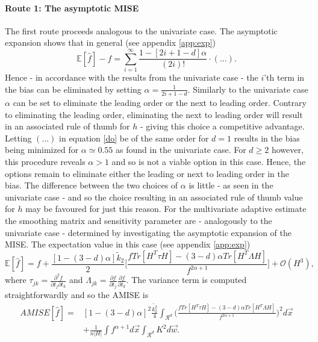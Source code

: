 \documentclass[
twoside,
openright,
titlepage,
numbers=noenddot,
headinclude,%
footinclude=true,
dottedtoc, %
ngerman,
american, %
pagesize=pdftex,
]{book}
\begin{document}
	\paragraph{Route 1: The asymptotic MISE}
	The first route proceeds analogous to the univariate case. The asymptotic expansion shows that in general (see appendix \ref{app:exp})
	\begin{equation}
		\mathbb{E}[\hat{f}]-f=\sum_{i=1}^{\infty}\frac{1-[2i+1-d]\alpha}{(2i)!}\cdot (\dots).
		\label{do}
	\end{equation}
	Hence - in accordance with the results from the univariate case - the $i$'th term in the bias can be eliminated by setting $\alpha=\frac{1}{2i+1-d}$. Similarly to the univariate case $\alpha$ can be set to eliminate the leading order or the next to leading order. Contrary to eliminating the leading order, eliminating the next to leading order will result in an associated rule of thumb for $h$ - giving this choice a competitive advantage. Letting $(\dots)$ in equation \eqref{do} be of the same order for $d=1$ results in the bias being minimized for $\alpha\simeq 0.55$ as found in the univariate case. For $d\geq 2$ however, this procedure reveals $\alpha>1$ and so is not a viable option in this case. Hence, the options remain to eliminate either the leading or next to leading order in the bias. The difference between the two choices of $\alpha$ is little - as seen in the univariate case - and so the choice resulting in an associated rule of thumb value for $h$ may be favoured for just this reason.\newline\newline
	\noindent For the multivariate adaptive estimate the smoothing matrix and sensitivity parameter are - analogously to the univariate case - determined by investigating the asymptotic expansion of the MISE. The expectation value in this case (see appendix \ref{app:exp})
	\begin{equation}
		\mathbb{E}[\hat{f}]=f+\frac{[1-(3-d)\alpha]\tilde{k}_2}{2}\bigg[\frac{fTr[H^T\tau H]-(3-d)\alpha Tr[H^T\Lambda H]}{f^{2\alpha+1}}\bigg]+\mathcal{O}(H^3),
	\end{equation}
	where $\tau_{jk}=\frac{\partial^2 f}{\partial t_j\partial t_k}$ and $\Lambda_{jk}=\frac{\partial f}{\partial t_j}\frac{\partial f}{\partial t_k}$. The variance term is computed straightforwardly and so the AMISE is
	\begin{equation}
		\begin{split}
			AMISE[\hat{f}]=& [1-(3-d)\alpha]^2\frac{\tilde{k_2^2}}{4}\int_{\mathcal{R}^d} \bigg(\frac{fTr[H^T\tau H]-(3-d)\alpha Tr[H^T\Lambda H]}{f^{2\alpha+1}}\bigg)^2d\vec{x}\\
			&+\frac{1}{n|H|}\int f^{\alpha+1}d\vec{x}  \int_{\mathcal{R}^d} K^2d\vec{w}.
		\end{split}
		\label{mise4}
	\end{equation}
\end{document}
